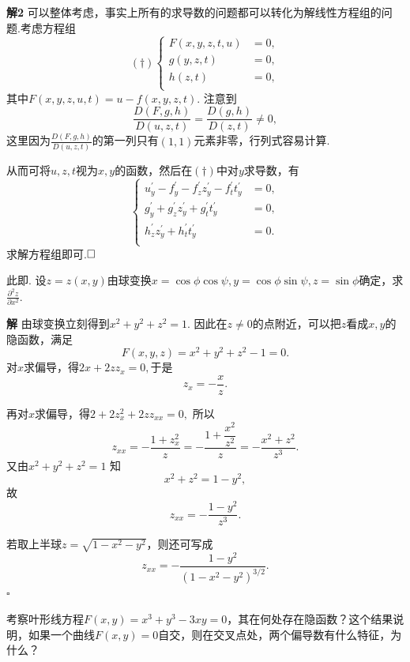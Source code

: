 \documentclass{ctexart}
\newenvironment{custom}[1]{\par\noindent \textbf{#1}\quad}{\par\vspace{1em}}
\begin{document}
\begin{custom}{解2}
可以整体考虑，事实上所有的求导数的问题都可以转化为解线性方程组的问题.考虑方程组
$$(\dagger)\left\{\begin{aligned}F(x,y,z,t,u)&=0,\\ g(y,z,t)&=0,\\h(z,t)&=0,\\\end{aligned}\right.$$
其中$F(x,y,z,u,t)=u-f(x,y,z,t)$. 注意到
$$\frac{D(F,g,h)}{D(u,z,t)}=\frac{D(g,h)}{D(z,t)}\neq 0,$$
这里因为$\frac{D(F,g,h)}{D(u,z,t)}$的第一列只有$(1,1)$元素非零，行列式容易计算.

从而可将$u,z,t$视为$x,y$的函数，然后在$(\dagger)$中对$y$求导数，有
$$\left\{\begin{aligned}u^{\prime}_{y}-f^{\prime}_{y}-f^{\prime}_{z}z^{\prime}_{y}-f^{\prime}_{t}t^{\prime}_{y}&=0,\\ g^{\prime}_{y}+g^{\prime}_{z}z^{\prime}_{y}+g^{\prime}_{t}t^{\prime}_{y}&=0,\\ h^{\prime}_{z}z^{\prime}_{y}+h^{\prime}_{t}t^{\prime}_{y}&=0.\\\end{aligned}\right.$$
求解方程组即可.$\hfill{\square}$
\end{custom}


\begin{exercise}
此即\cite[例题20.2.3]{XHM}. 设$z=z(x,y)$由球变换$x=\cos{\phi}\cos{\psi},y=\cos{\phi}\sin{\psi},z=\sin{\phi}$确定，求$\frac{\partial^{2}z}{\partial x^{2}}$.
\end{exercise}

\begin{custom}{解}
由球变换立刻得到$x^2+y^2+z^2=1$. 因此在$z\neq 0$的点附近，可以把$z$看成$x,y$的隐函数，满足
\[
F(x,y,z)=x^2+y^2+z^2-1=0.
\]
对$x$求偏导，得$2x+2z z_x=0,$于是
\[
z_x=-\frac{x}{z}.
\]

再对$x$求偏导，得$2+2z_x^2+2z z_{xx}=0,$
所以
\[
z_{xx}=-\frac{1+z_x^2}{z}
=-\frac{1+\dfrac{x^2}{z^2}}{z}
=-\frac{x^2+z^2}{z^3}.
\]
又由$x^2+y^2+z^2=1$
知
\[
x^2+z^2=1-y^2,
\]
故
\[
\boxed{
z_{xx}=-\frac{1-y^2}{z^3}
}.
\]

若取上半球$z=\sqrt{1-x^2-y^2}$，则还可写成
\[
\boxed{
z_{xx}=-\frac{1-y^2}{(1-x^2-y^2)^{3/2}}
}.
\]
\hfill$\square$
\end{custom}

\begin{exercise}
考察叶形线方程$F(x,y)=x^{3}+y^{3}-3xy=0$，其在何处存在隐函数？这个结果说明，如果一个曲线$F(x,y)=0$自交，则在交叉点处，两个偏导数有什么特征，为什么？
\end{exercise}
\end{document}
